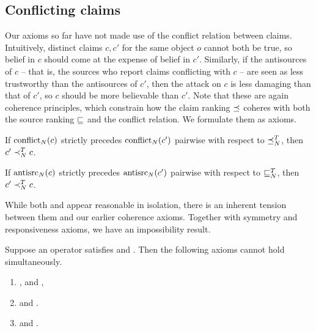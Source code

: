 
\subsection{Conflicting claims}
\label{td_new_sec_conflicting_claims}

Our axioms so far have not made use of the conflict relation between claims.
Intuitively, distinct claims $c, c'$ for the same object $o$ cannot both be
true, so belief in $c$ should come at the expense of belief in $c'$. Similarly,
if the antisources of $c$ -- that is, the sources who report claims conflicting
with $c$ -- are seen as less trustworthy than the antisources of $c'$, then the
attack on $c$ is less damaging than that of $c'$, so $c$ should be more
believable than $c'$. Note that these are again coherence principles, which
constrain how the claim ranking $\preceq$ coheres with both the source ranking
$\sqsubseteq$ and the conflict relation. We formulate them as axioms.

\begin{axiomlist}
\begin{axiom}[\conflictcoherence{}]
    If $\operatorname{conflict}_N(c)$ strictly precedes $\operatorname{conflict}_N(c')$ pairwise with
    respect to $\preceq_N^T$, then $c' \prec_N^T c$.
\end{axiom}
\begin{axiom}[\anticoherence{}]
    If $\operatorname{antisrc}_N(c)$ strictly precedes $\operatorname{antisrc}_N(c')$ pairwise with respect
    to $\sqsubseteq_N^T$, then $c' \prec_N^T c$.
\end{axiom}
\end{axiomlist}

While both \conflictcoherence{} and \anticoherence{} appear reasonable in
isolation, there is an inherent tension between them and our earlier coherence
axioms. Together with symmetry and responsiveness axioms, we have an
impossibility result.

\begin{theorem}
    \label{td_new_thm_conflict_impossibilities}
    Suppose an operator satisfies \symmetry{} and \claimcoherence{}. Then the
    following axioms cannot hold simultaneously.
    \begin{enumerate}
        \item \freshposresp{}, \sourcecoherence{} and \conflictcoherence{},
        \item \sourceposresp{} and \conflictcoherence{}.
        \item \sourceposresp{} and \anticoherence{}.
    \end{enumerate}
\end{theorem}

